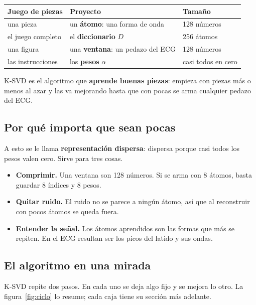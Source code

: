 \documentclass[11pt,letterpaper]{article}
\begin{document}
\begin{center}
\begin{tabular}{lll}
    \toprule
    \textbf{Juego de piezas} & \textbf{Proyecto} & \textbf{Tamaño} \\
    \midrule
    una pieza          & un \textbf{átomo}: una forma de onda
                       & 128 números \\
    el juego completo  & el \textbf{diccionario} $D$
                       & 256 átomos \\
    una figura         & una \textbf{ventana}: un pedazo del ECG
                       & 128 números \\
    las instrucciones  & los \textbf{pesos} $\alpha$
                       & casi todos en cero \\
    \bottomrule
\end{tabular}
\end{center}

K-SVD es el algoritmo que \textbf{aprende buenas piezas}: empieza con
piezas más o menos al azar y las va mejorando hasta que con pocas se
arma cualquier pedazo del ECG.

\subsection*{Por qué importa que sean pocas}

A esto se le llama \textbf{representación dispersa}: dispersa porque
casi todos los pesos valen cero. Sirve para tres cosas.

\begin{itemize}[itemsep=0.3em]
    \item \textbf{Comprimir.} Una ventana son 128 números. Si se arma
          con 8 átomos, basta guardar 8 índices y 8 pesos.
    \item \textbf{Quitar ruido.} El ruido no se parece a ningún átomo,
          así que al reconstruir con pocos átomos se queda fuera.
    \item \textbf{Entender la señal.} Los átomos aprendidos son las
          formas que más se repiten. En el ECG resultan ser los picos
          del latido y sus ondas.
\end{itemize}

\subsection*{El algoritmo en una mirada}

K-SVD repite dos pasos. En cada uno se deja algo fijo y se mejora lo
otro. La figura~\ref{fig:ciclo} lo resume; cada caja tiene su sección
más adelante.
\end{document}
